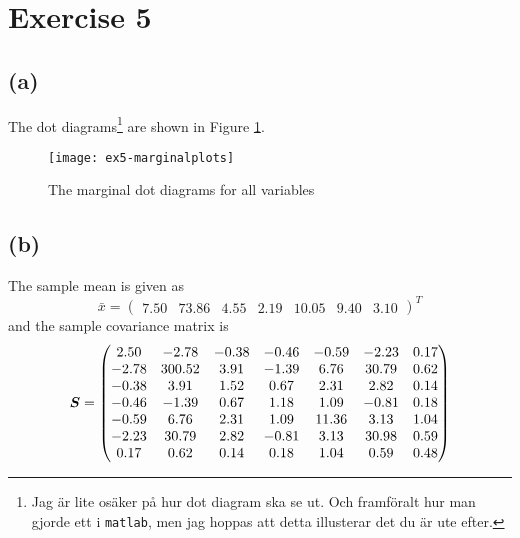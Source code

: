 
\section*{Exercise 5}
\label{sec:exercise5}

\subsection*{(a)}
\label{sec:a-4}

The dot diagrams\footnote{Jag är lite osäker på hur dot diagram ska se
  ut. Och framföralt hur man gjorde ett i \texttt{matlab}, men jag
  hoppas att detta illusterar det du är ute efter.} are shown in Figure \ref{fig:ex5-marginalplots}. 

\begin{figure}[h]
  \centering
  \texttt{[image: ex5-marginalplots]}
  \caption{The marginal dot diagrams for all variables}
  \label{fig:ex5-marginalplots}
\end{figure}

\subsection*{(b)}
\label{sec:b-4}

The sample mean is given as
\begin{equation*}
  \bar{x} =
  \begin{pmatrix}
    7.50 & 73.86 & 4.55 & 2.19 & 10.05 & 9.40 & 3.10 
  \end{pmatrix}^T
\end{equation*}
and the sample covariance matrix is
\begin{equation*}
  \bm{S} =
  \begin{pmatrix}
    2.50 & -2.78 & -0.38 & -0.46 & -0.59 & -2.23 & 0.17 \\ 
    -2.78 & 300.52 & 3.91 & -1.39 & 6.76 & 30.79 & 0.62 \\ 
    -0.38 & 3.91 & 1.52 & 0.67 & 2.31 & 2.82 & 0.14 \\ 
    -0.46 & -1.39 & 0.67 & 1.18 & 1.09 & -0.81 & 0.18 \\ 
    -0.59 & 6.76 & 2.31 & 1.09 & 11.36 & 3.13 & 1.04 \\ 
    -2.23 & 30.79 & 2.82 & -0.81 & 3.13 & 30.98 & 0.59 \\ 
    0.17 & 0.62 & 0.14 & 0.18 & 1.04 & 0.59 & 0.48 \\ 
  \end{pmatrix}
\end{equation*}

